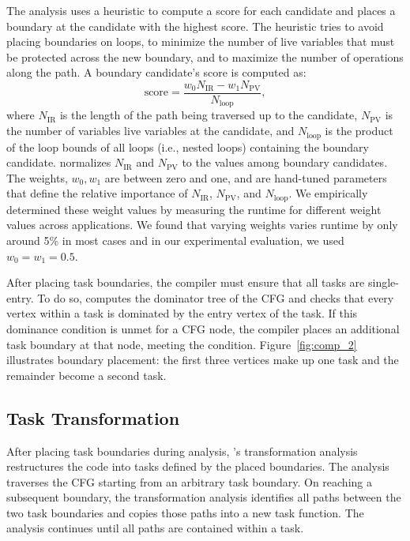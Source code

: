 The analysis uses a heuristic to compute a score for each candidate and places
a boundary at the candidate with the highest score. The heuristic tries to
avoid placing boundaries on loops, to minimize the number of live variables
that must be protected across the new boundary, and to maximize the number of
operations along the path.  A boundary candidate's score is computed as:
%
\begin{equation}
\text{score} = \frac{w_{0} N_{\text{IR}} - w_{1} N_{\text{PV}}}{N_{\text{loop}}},\nonumber
\end{equation}
%
where $N_{\text{IR}}$ is the length of the path being traversed up to the
candidate, $N_{\text{PV}}$ is the number of variables live variables at the
candidate, and $N_{\text{loop}}$ is the product of the loop bounds of all loops
(i.e., nested loops) containing the boundary candidate. \sys normalizes
$N_{\text{IR}}$ and $N_{\text{PV}}$ to the values among boundary candidates.
The weights, $w_{0}, w_{1}$ are between zero and one, and are
hand-tuned parameters that define the relative importance of $N_{\text{IR}}$,
$N_{\text{PV}}$, and $N_{\text{loop}}$.  We empirically determined these weight
values by measuring the runtime for different weight values across
applications.  We found that varying weights varies runtime by only around 5\%
in most cases and in our experimental evaluation, we used $w_{0} = w_{1} =
0.5$.  

After placing task boundaries, the compiler must ensure that all tasks are
single-entry.  To do so, \sys computes the dominator tree of the CFG and checks
that every vertex within a task is dominated by the entry vertex of the task.
If this dominance condition is unmet for a CFG node, the compiler places
an additional task boundary at that node, meeting the condition.
%
Figure~\ref{fig:comp_2} illustrates boundary placement: the first three
vertices make up one task and the remainder become a second task.



\subsection{Task Transformation}
\label{sec:compiler_transform_pass}


After placing task boundaries during analysis, \sys's transformation analysis
restructures the code into tasks defined by the placed boundaries. The analysis
traverses the CFG starting from an arbitrary task boundary.  On reaching a
subsequent boundary, the transformation analysis identifies all paths between
the two task boundaries and copies those paths into a new task function.  The
analysis continues until all paths are contained within a task. 

